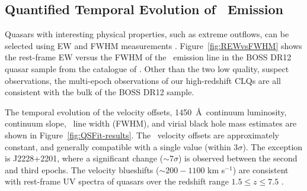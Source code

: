 \documentclass[fleqn,usenatbib]{mnras}
\begin{document}
\subsection{Quantified Temporal Evolution of \civ\ Emission}
Quasars with interesting physical properties, such as extreme
outflows, can be selected using EW and FWHM measurements \citep[e.g.,
``Extremely Red Quasars'' ---][]{Ross2015, Zakamska2016, Zakamska2019,
Hamann2017}. Figure~\ref{fig:REWvsFWHM} shows the rest-frame EW versus
the FWHM of the \civ\ emission line in the BOSS DR12 quasar sample
from the catalogue of \citet{Hamann2017}.  Other than the two low
quality, suspect observations, the multi-epoch observations of our
high-redshift CLQs are all consistent with the bulk of the BOSS DR12
sample.

The temporal evolution of the velocity offsets, 1450~\AA\ continuum
luminosity, continuum slope, \civ\ line width (FWHM), and virial black
hole mass estimates are shown in Figure~\ref{fig:QSFit-results}.  The
\civ\ velocity offsets are approximately constant, and generally
compatible with a single value (within 3$\sigma$).  The exception is
J2228+2201, where a significant change ($\sim$7$\sigma$) is observed
between the second and third epochs. The velocity blueshifts ($\sim
200-1100$ km s$^{-1}$) are consistent with rest-frame UV spectra of
quasars over the redshift range $1.5 \leq z \leq 7.5$
\citep[e.g.,][]{Meyer2019}.
\end{document}
